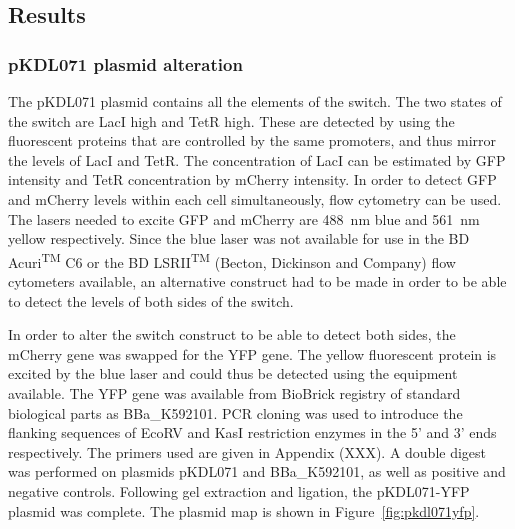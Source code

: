 \subsection{Results}

\subsubsection{pKDL071 plasmid alteration}


The pKDL071 plasmid contains all the elements of the switch. The two states of the switch are LacI high and TetR high. These are detected by using the fluorescent proteins that are controlled by the same promoters, and thus mirror the levels of LacI and TetR. The concentration of LacI can be estimated by GFP intensity and TetR concentration by mCherry intensity. In order to detect GFP and mCherry levels within each cell simultaneously, flow cytometry can be used. The lasers needed to excite GFP and mCherry are \SI{488}{\nano\meter} blue and \SI{561}{\nano\meter} yellow respectively. Since the blue laser was not available for use in the BD Acuri\textsuperscript{TM} C6 or the BD LSRII\textsuperscript{TM} (Becton, Dickinson and Company) flow cytometers available, an alternative construct had to be made in order to be able to detect the levels of both sides of the switch. 

In order to alter the switch construct to be able to detect both sides, the mCherry gene was swapped for the YFP gene. The yellow fluorescent protein is excited by the blue laser and could thus be detected using the equipment available. The YFP gene was available from BioBrick registry of standard biological parts as BBa\_K592101. PCR cloning was used to introduce the flanking sequences of EcoRV and KasI restriction enzymes in the 5' and 3' ends respectively. The primers used are given in Appendix (XXX). A double digest was performed on plasmids pKDL071 and BBa\_K592101, as well as positive and negative controls. Following gel extraction and ligation, the pKDL071-YFP plasmid was complete. The plasmid map is shown in Figure~\ref{fig:pkdl071yfp}.

